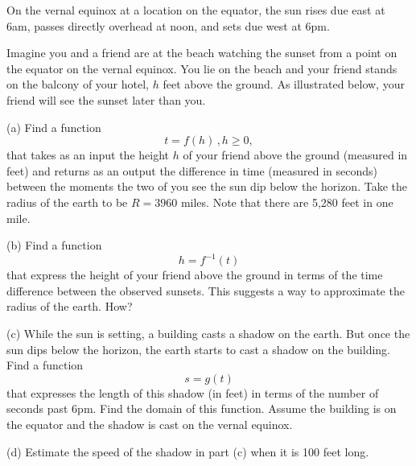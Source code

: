 \documentclass{ximera}
\begin{document}
\begin{question} \label{Q6:RightTriangle}
On the vernal equinox at a location on the equator, the sun rises due east at 6am, passes directly overhead at noon, and sets due west at 6pm. 

Imagine you and a friend are at the beach watching the sunset from a point on the equator on the vernal equinox. You lie on the beach and your friend stands on the balcony of your hotel, $h$ feet above the ground. As illustrated below, your friend will see the sunset later than you. 

(a) Find a function
\[
   t = f(h) \, , h\geq 0 ,
\]
that takes as an input the height $h$ of your friend above the ground (measured in feet) and returns as an output the difference in time (measured in seconds) between the moments the two of you see the sun dip below the horizon. Take the radius of the earth to be $R=3960$ miles. Note that there are 5,280 feet in one mile.

(b) Find a function 
\[
   h = f^{-1}(t)
\]
that express the height of your friend above the ground in terms of the time difference between the observed sunsets. This suggests a way to approximate the radius of the earth. How?

(c) While the sun is setting, a building casts a shadow on the earth. But once the sun dips below the horizon, the earth starts to cast a shadow on the building. Find a function
\[
  s = g(t) 
\]
that expresses the length of this shadow (in feet) in terms of the number of seconds past 6pm. Find the domain of this function. Assume the building is on the equator and the shadow is cast on the vernal equinox.

(d) Estimate the speed of the shadow in part (c) when it is 100 feet long.
\begin{exploration}

 
\begin{onlineOnly}
    \begin{center}
\end{center}
\end{onlineOnly}
\end{exploration}

\end{question}
\end{document}
